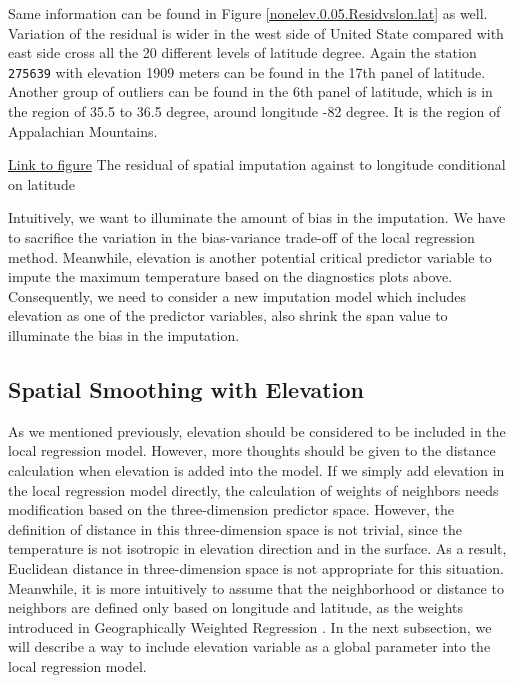 Same information can be found in Figure 
\href{../plots/a1950/spaimpute/nonelev/span0.05/a1950.spaResid.vs.lon.lat.pdf}
{\ref*{nonelev.0.05.Residvslon.lat}} as well. Variation of the residual is wider
in the west side of United State compared with east side cross all the 20 different
levels of latitude degree. Again the station \texttt{275639} with elevation 1909 
meters can be found in the 17th panel of latitude. Another group of outliers can 
be found in the 6th panel of latitude, which is in the region of 35.5 to 36.5 degree, 
around longitude -82 degree. It is the region of Appalachian Mountains.

\begin{framed}
\begin{center}
  \href{../plots/a1950/spaimpute/nonelev/span0.05/a1950.spaResid.vs.lon.lat.pdf}
  {Link to figure}
  {The residual of spatial imputation against to longitude conditional on latitude}
  \label{nonelev.0.05.Residvslon.lat}
\end{center}
\end{framed}

Intuitively, we want to illuminate the amount of bias in the imputation. We have 
to sacrifice the variation in the bias-variance trade-off of the local regression
method. Meanwhile, elevation is another potential critical predictor variable to
impute the maximum temperature based on the diagnostics plots above.
Consequently, we need to consider a new imputation model which includes elevation as
one of the predictor variables, also shrink the span value to illuminate the 
bias in the imputation.

\subsection{Spatial Smoothing with Elevation}

As we mentioned previously, elevation should be considered to be included in the 
local regression model. However, more thoughts should be given to the distance 
calculation when elevation is added into the model. If we simply add elevation
in the local regression model directly, the calculation of weights of neighbors
needs modification based on the three-dimension predictor space. However, the 
definition of distance in this three-dimension space is not trivial, since the
temperature is not isotropic in elevation direction and in the surface. As a 
result, Euclidean distance in three-dimension space is not appropriate for this
situation. Meanwhile, it is more intuitively to assume that the neighborhood or
distance to neighbors are defined only based on longitude and latitude, as the
weights introduced in Geographically Weighted Regression \cite{fotheringhamGWR}.
In the next subsection, we will describe a way to include elevation variable as
a global parameter into the local regression model.

